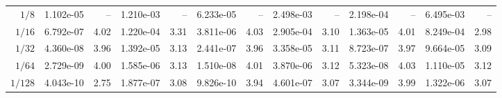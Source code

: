 \begin{landscape}
\begin{center}
\begin{tabular}{
r rr rr rr rr rr rr
}
\midrule
$1/8$ & 1.102e-05 & -- & 1.210e-03 & -- & 6.233e-05 & -- & 2.498e-03 & -- & 2.198e-04 & -- & 6.495e-03 & -- \\
$1/16$ & 6.792e-07 & 4.02 & 1.220e-04 & 3.31 & 3.811e-06 & 4.03 & 2.905e-04 & 3.10 & 1.363e-05 & 4.01 & 8.249e-04 & 2.98 \\
$1/32$ & 4.360e-08 & 3.96 & 1.392e-05 & 3.13 & 2.441e-07 & 3.96 & 3.358e-05 & 3.11 & 8.723e-07 & 3.97 & 9.664e-05 & 3.09 \\
$1/64$ & 2.729e-09 & 4.00 & 1.585e-06 & 3.13 & 1.510e-08 & 4.01 & 3.870e-06 & 3.12 & 5.323e-08 & 4.03 & 1.110e-05 & 3.12 \\
$1/128$ & 4.043e-10 & 2.75 & 1.877e-07 & 3.08 & 9.826e-10 & 3.94 & 4.601e-07 & 3.07 & 3.344e-09 & 3.99 & 1.322e-06 & 3.07 \\
\bottomrule
\end{tabular}
\end{center}
\vfill
\begin{center}\thepage\end{center}
\end{landscape}
\par\linenumbers
